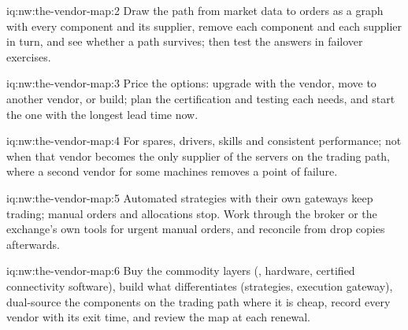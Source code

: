 \begin{solution}{iq:nw:the-vendor-map:2}
Draw the path from market data to orders as a graph with every component and its supplier, remove each component and each supplier in
turn, and see whether a path survives; then test the answers in failover exercises.
\end{solution}

\begin{solution}{iq:nw:the-vendor-map:3}
Price the options: upgrade with the vendor, move to another vendor, or build; plan the certification and testing each needs, and start
the one with the longest lead time now.
\end{solution}

\begin{solution}{iq:nw:the-vendor-map:4}
For spares, drivers, skills and consistent performance; not when that vendor becomes the only supplier of the servers on the trading
path, where a second vendor for some machines removes a point of failure.
\end{solution}

\begin{solution}{iq:nw:the-vendor-map:5}
Automated strategies with their own gateways keep trading; manual orders and allocations stop. Work through the broker or the exchange's
own tools for urgent manual orders, and reconcile from drop copies afterwards.
\end{solution}

\begin{solution}{iq:nw:the-vendor-map:6}
Buy the commodity layers (, hardware, certified connectivity software), build what differentiates (strategies, execution
gateway), dual-source the components on the trading path where it is cheap, record every vendor with its exit time, and review the map
at each renewal.
\end{solution}
